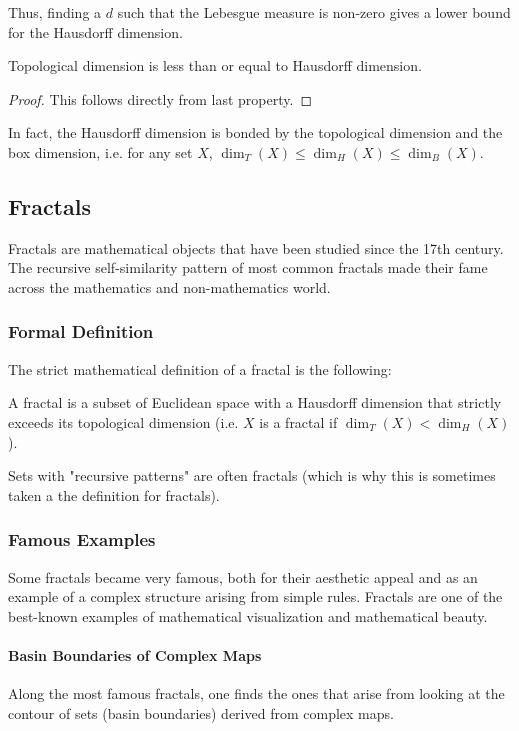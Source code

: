 Thus, finding a $d$ such that the Lebesgue measure is non-zero gives a lower bound for the Hausdorff dimension.

\begin{property}
	Topological dimension is less than or equal to Hausdorff dimension.
\end{property}
\begin{proof}
	This follows directly from last property.
\end{proof}

In fact, the Hausdorff dimension is bonded by the topological dimension and the box dimension, i.e. for any set $X$, $\dim_T(X) \leq \dim_H(X) \leq \dim_B(X)$.

\subsection{Fractals}
Fractals are mathematical objects that have been studied since the 17th century.
The recursive self-similarity pattern of most common fractals made their fame across the mathematics and non-mathematics world.

\subsubsection{Formal Definition}
The strict mathematical definition of a fractal is the following:
\begin{definition}[Fractal]\label{def:fractal}
	A fractal is a subset of Euclidean space with a Hausdorff dimension that strictly exceeds its topological dimension (i.e. $X$ is a fractal if $\dim_T(X) < \dim_H(X)$).
\end{definition}
Sets with "recursive patterns" are often fractals (which is why this is sometimes taken a the definition for fractals).

\subsubsection{Famous Examples}\label{fractalsExamples}
Some fractals became very famous, both for their aesthetic appeal and as an example of a complex structure arising from simple rules.
Fractals are one of the best-known examples of mathematical visualization and mathematical beauty.

\paragraph{Basin Boundaries of Complex Maps}
Along the most famous fractals, one finds the ones that arise from looking at the contour of sets (basin boundaries) derived from complex maps.

